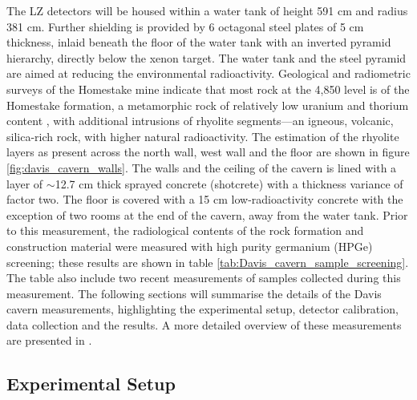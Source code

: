 The LZ detectors will be housed within a water tank of height 591 cm and radius 381 cm. Further shielding is provided by 6 octagonal steel plates of 5 cm thickness, inlaid beneath the floor of the water tank with an inverted pyramid hierarchy, directly below the xenon target. The water tank and the steel pyramid are aimed at reducing the environmental radioactivity. Geological and radiometric surveys of the Homestake mine indicate that most rock at the 4,850 level is of the Homestake formation, a metamorphic rock of relatively low uranium and thorium content \cite{Heise_2015}, with additional intrusions of rhyolite segments---an igneous, volcanic, silica-rich rock, with higher natural radioactivity. The estimation of the rhyolite layers as present across the north wall, west wall and the floor are shown in figure \ref{fig:davis_cavern_walls}. The walls and the ceiling of the cavern is lined with a layer of $\sim$12.7 cm thick sprayed concrete (shotcrete) with a thickness variance of factor two. The floor is covered with a 15 cm low-radioactivity concrete with the exception of two rooms at the end of the cavern, away from the water tank. Prior to this measurement, the radiological contents of the rock formation and construction material were measured with high purity germanium (HPGe) screening; these results are shown in table \ref{tab:Davis_cavern_sample_screening}. The table also include two recent measurements of samples collected during this measurement. The following sections will summarise the details of the Davis cavern \gray{} measurements, highlighting the experimental setup, detector calibration, data collection and the results. A more detailed overview of these measurements are presented in \cite{Akerib_2020_gray_measurements}.




\subsection{Experimental Setup}
\label{secsec:experimental_setup}

